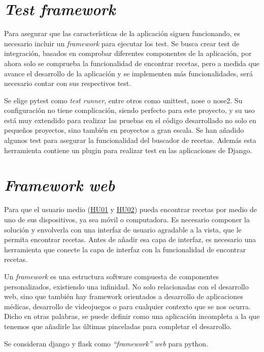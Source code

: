 \section{\emph{Test framework}}
Para asegurar que las características de la aplicación siguen funcionando, es necesario incluir un \emph{framework} para ejecutar los test. Se busca crear test de integración, basados en comprobar diferentes componentes de la aplicación, por ahora solo se comprueba la funcionalidad de encontrar recetas, pero a medida que avance el desarrollo de la aplicación y se implementen más funcionalidades, será necesario contar con sus respectivos test.

Se elige pytest como \emph{test runner}, entre otros como unittest, nose o nose2. Su configuración no tiene complicación, siendo perfecto para este proyecto, y su uso está muy extendido para realizar las pruebas en el código desarrollado no solo en pequeños proyectos, sino también en proyectos a gran escala. Se han añadido algunos test para asegurar la funcionalidad del buscador de recetas. Además esta herramienta contiene un plugin para realizar test en las aplicaciones de Django.

\section{\emph{Framework web}}
Para que el usuario medio (\href{https://github.com/Slowmybrosh/TFG-DietPlanner/issues/22}{HU01} y \href{https://github.com/Slowmybrosh/TFG-DietPlanner/issues/41}{HU02}) pueda encontrar recetas por medio de uno de sus dispositivos, ya sea móvil o computadora. Es necesario componer la solución y envolverla con una interfaz de usuario agradable a la vista, que le permita encontrar recetas. Antes de añadir esa capa de interfaz, es necesario una herramienta que conecte la capa de interfaz con la funcionalidad de encontrar recetas. 

Un \emph{\gls{framework}} es una estructura software compuesta de componentes personalizados, existiendo una infinidad. No solo relacionadas con el desarrollo web, sino que también hay \gls{framework} orientados a desarrollo de aplicaciones médicas, desarrollo de videojuegos o para cualquier contexto que se nos ocurra. Dicho en otras palabras, se puede definir como una aplicación incompleta a la que tenemos que añadirle las últimas pinceladas para completar el desarrollo. 

Se consideran \Gls{django} y \Gls{flask} como \emph{``framework'' web} para \Gls{python}.

